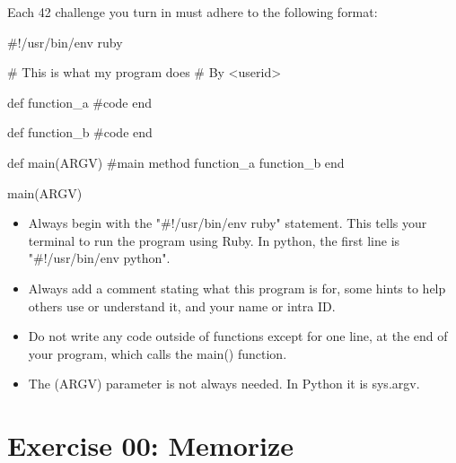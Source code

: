 \documentclass{42-en}
\begin{document}
Each 42 challenge you turn in must adhere to the following format:

\begin{42rbcode}
#!/usr/bin/env ruby

# This is what my program does
# By <userid>

def function_a
 #code
end

def function_b
 #code
end

def main(ARGV)
 #main method
 function_a
 function_b
end

main(ARGV)
\end{42rbcode}

\begin{itemize}
	\item Always begin with the "\#!/usr/bin/env ruby" statement. This tells your terminal to run the program using Ruby. In python, the first line is "\#!/usr/bin/env python".
	\item Always add a comment stating what this program is for, some hints to help others use or understand it, and your name or intra ID.
	\item Do not write any code outside of functions except for one line, at the end of your program, which calls the main() function.
	\item The (ARGV) parameter is not always needed. In Python it is sys.argv.
\end{itemize}


\startexercices



\chapter{Exercise 00: Memorize}

\makeheaderfiles
\end{document}
